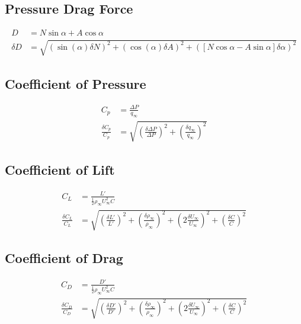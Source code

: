 \documentclass[runningheads]{llncs}
\begin{document}
\subsection{Pressure Drag Force}

\begin{align*}
    D &= N\sin\alpha + A\cos\alpha \\
    \delta D &= \sqrt{\left(\sin(\alpha)\delta N\right)^2 + \left(\cos(\alpha)\delta A\right)^2 + \left(\left[N\cos\alpha - A\sin\alpha\right]\delta \alpha\right)^2}
\end{align*}

\subsection{Coefficient of Pressure}

\begin{align*}
    C_p &= \frac{\Delta P}{q_\infty} \\
    \frac{\delta C_p}{C_p} &= \sqrt{ (\frac{\delta \Delta P}{\Delta P})^2 + (\frac{\delta q_\infty}{q_\infty})^2}
\end{align*}

\subsection{Coefficient of Lift}


\begin{align*}
    C_L &= \frac{L'}{\frac{1}{2}\rho_\infty U^2_\infty C} \\
    \frac{\delta C_L}{C_L} &= \sqrt{\left(\frac{\delta L'}{L'}\right)^2 + \left(\frac{\delta\rho_\infty}{\rho_\infty}\right)^2 + \left(2\frac{\delta U_\infty}{U_\infty}\right)^2 +\left(\frac{\delta C}{C}\right)^2}
\end{align*}

\subsection{Coefficient of Drag}


\begin{align*}
    C_D &= \frac{D'}{\frac{1}{2}\rho_\infty U^2_\infty C} \\
    \frac{\delta C_D}{C_D} &= \sqrt{\left(\frac{\delta D'}{D'}\right)^2 + \left(\frac{\delta\rho_\infty}{\rho_\infty}\right)^2 + \left(2\frac{\delta U_\infty}{U_\infty}\right)^2 +\left(\frac{\delta C}{C}\right)^2}
\end{align*}
\end{document}

